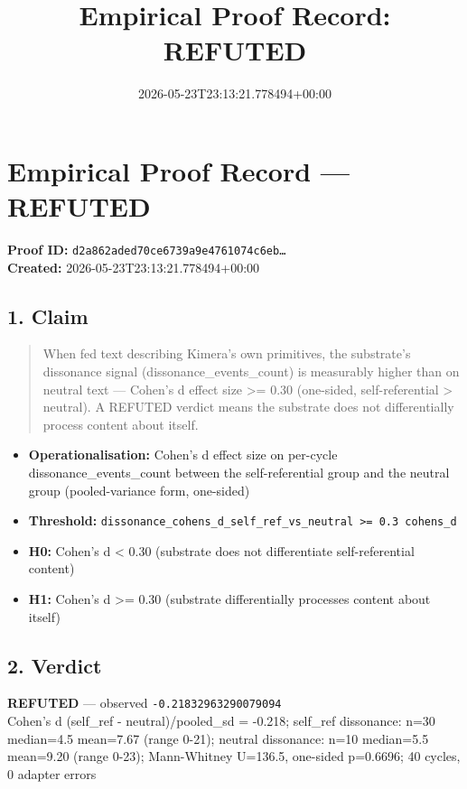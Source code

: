 \documentclass{article}
\title{Empirical Proof Record: REFUTED}
\date{2026-05-23T23:13:21.778494+00:00}
\begin{document}
\maketitle
\section*{Empirical Proof Record --- \textcolor{refuted}{\textbf{REFUTED}}}
\textbf{Proof ID:} \texttt{d2a862aded70ce6739a9e4761074c6eb\dots}\\
\textbf{Created:} 2026-05-23T23:13:21.778494+00:00
\subsection*{1. Claim}
\begin{quote}When fed text describing Kimera's own primitives, the substrate's dissonance signal (dissonance\_events\_count) is measurably higher than on neutral text — Cohen's d effect size >= 0.30 (one-sided, self-referential > neutral). A REFUTED verdict means the substrate does not differentially process content about itself.\end{quote}
\begin{itemize}
\item \textbf{Operationalisation:} Cohen's d effect size on per-cycle dissonance\_events\_count between the self-referential group and the neutral group (pooled-variance form, one-sided)
\item \textbf{Threshold:} \texttt{dissonance\_cohens\_d\_self\_ref\_vs\_neutral >= 0.3 cohens\_d}
\item \textbf{H0:} Cohen's d < 0.30 (substrate does not differentiate self-referential content)
\item \textbf{H1:} Cohen's d >= 0.30 (substrate differentially processes content about itself)
\end{itemize}
\subsection*{2. Verdict}
\textcolor{refuted}{\textbf{REFUTED}} --- observed \texttt{-0.21832963290079094}\\
Cohen's d (self\_ref - neutral)/pooled\_sd = -0.218; self\_ref dissonance: n=30 median=4.5 mean=7.67 (range 0-21); neutral dissonance: n=10 median=5.5 mean=9.20 (range 0-23); Mann-Whitney U=136.5, one-sided p=0.6696; 40 cycles, 0 adapter errors
\end{document}
